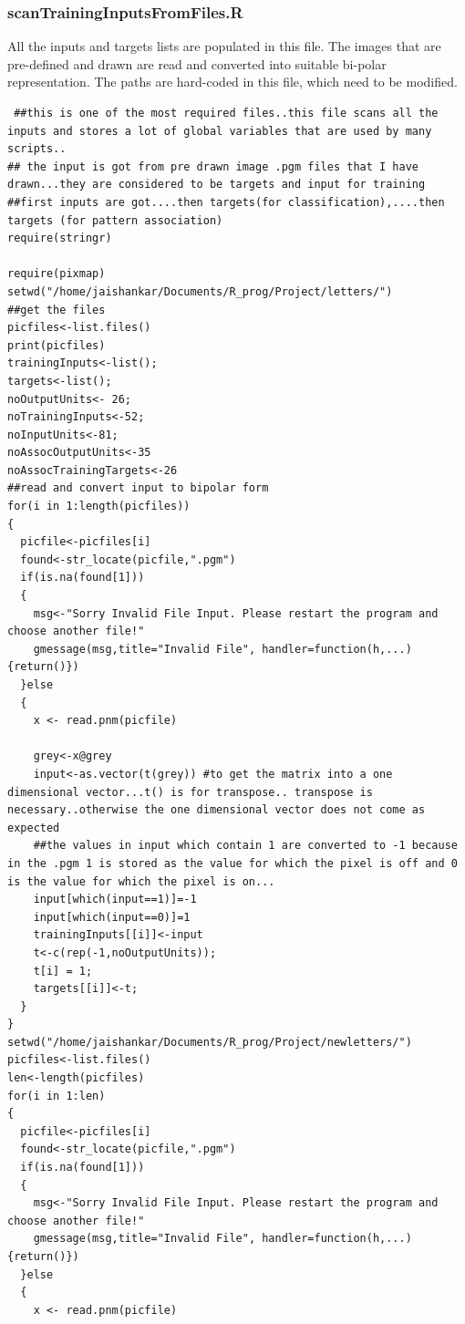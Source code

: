 \documentclass[a4paper,12pt]{report}
\begin{document}
\subsubsection*{scanTrainingInputsFromFiles.R}
All the inputs and targets lists are populated in this file. The images that are pre-defined and drawn are read and 
converted into suitable bi-polar representation. The paths are hard-coded in this file, which need to be modified.
\begin{verbatim}
 ##this is one of the most required files..this file scans all the inputs and stores a lot of global variables that are used by many scripts..
## the input is got from pre drawn image .pgm files that I have drawn...they are considered to be targets and input for training
##first inputs are got....then targets(for classification),....then targets (for pattern association)
require(stringr)

require(pixmap)
setwd("/home/jaishankar/Documents/R_prog/Project/letters/")
##get the files
picfiles<-list.files()
print(picfiles)
trainingInputs<-list();
targets<-list();
noOutputUnits<- 26;
noTrainingInputs<-52;
noInputUnits<-81;
noAssocOutputUnits<-35
noAssocTrainingTargets<-26
##read and convert input to bipolar form
for(i in 1:length(picfiles))
{
  picfile<-picfiles[i]
  found<-str_locate(picfile,".pgm")
  if(is.na(found[1]))
  {
    msg<-"Sorry Invalid File Input. Please restart the program and choose another file!"
    gmessage(msg,title="Invalid File", handler=function(h,...){return()})
  }else
  {
    x <- read.pnm(picfile)
    
    grey<-x@grey
    input<-as.vector(t(grey)) #to get the matrix into a one dimensional vector...t() is for transpose.. transpose is necessary..otherwise the one dimensional vector does not come as expected
    ##the values in input which contain 1 are converted to -1 because in the .pgm 1 is stored as the value for which the pixel is off and 0 is the value for which the pixel is on...
    input[which(input==1)]=-1
    input[which(input==0)]=1
    trainingInputs[[i]]<-input
    t<-c(rep(-1,noOutputUnits));
    t[i] = 1;
    targets[[i]]<-t;
  }
}
setwd("/home/jaishankar/Documents/R_prog/Project/newletters/")
picfiles<-list.files()
len<-length(picfiles)
for(i in 1:len)
{
  picfile<-picfiles[i]
  found<-str_locate(picfile,".pgm")
  if(is.na(found[1]))
  {
    msg<-"Sorry Invalid File Input. Please restart the program and choose another file!"
    gmessage(msg,title="Invalid File", handler=function(h,...){return()})
  }else
  {
    x <- read.pnm(picfile)
   

\end{verbatim}
\end{document}
